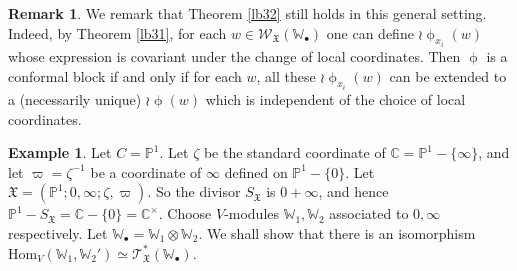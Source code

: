 \documentclass[12pt,a4paper,notitlepage]{report}
\theoremstyle{definition}
\newtheorem{eg}[df]{Example}
\newtheorem{rem}[df]{Remark}
\theoremstyle{plain}
\newcommand{\fk}{\mathfrak}
\newcommand{\Hom}{\mathrm{Hom}}
\newcommand{\scr}{\mathscr}
\newcommand{\blt}{\bullet}
\newcommand{\Wbb}{\mathbb W}
\newcommand{\Cbb}{\mathbb C}
\newcommand{\Pbb}{\mathbb P}
\numberwithin{equation}{section}
\begin{document}
\begin{rem}\label{lb40}
We remark that Theorem \ref{lb32} still holds in this general setting. Indeed, by Theorem \ref{lb31}, for each $w\in\scr W_{\fk X}(\Wbb_\blt)$ one can define $\wr\upphi_{x_i}(w)$ whose expression is covariant under the change of local coordinates. Then $\upphi$ is a conformal block if and only if for each $w$, all these $\wr\upphi_{x_i}(w)$ can be extended to  a (necessarily unique) $\wr\upphi(w)$ which is independent of the choice of local coordinates.
\end{rem}




\begin{eg}
Let $C=\Pbb^1$. Let $\zeta$ be the standard coordinate of $\Cbb=\Pbb^1-\{\infty\}$, and let $\varpi=\zeta^{-1}$ be a coordinate of $\infty$ defined on $\Pbb^1-\{0\}$. Let $\fk X=(\Pbb^1;0,\infty;\zeta,\varpi)$. So the divisor $S_{\fk X}$ is $0+\infty$, and hence $\Pbb^1-S_{\fk X}=\Cbb-\{0\}=\Cbb^\times$. Choose $V$-modules $\Wbb_1,\Wbb_2$ associated to $0,\infty$ respectively. Let $\Wbb_\blt=\Wbb_1\otimes\Wbb_2$. We shall show that there is an isomorphism $\Hom_V(\Wbb_1,\Wbb_2')\simeq\scr T_{\fk X}^*(\Wbb_\blt)$. 


\end{eg}
\end{document}
